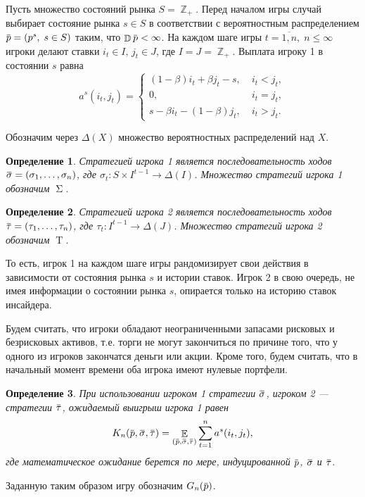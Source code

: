 \documentclass[12pt, draft]{extarticle}
\newtheorem{definition}{Определение}
\newcommand{\overbar}[1]%
{\mkern 1.5mu\overline{\mkern-1.3mu#1\mkern-1.3mu}\mkern 1.3mu}
\newcommand{\s}{\ensuremath{s}}
\newcommand{\p}{\ensuremath{\overbar{p}}}
\DeclareMathOperator{\E}{\mathbb{E}}
\DeclareMathOperator{\D}{\mathbb{D}}
\DeclareMathOperator{\Z}{\mathbb{Z}}
\newcommand{\G}[1][n]{\ensuremath{G_{#1}}}
\newcommand{\K}[1][n]{\ensuremath{K_{#1}}}
\DeclareMathOperator{\FPStrategies}{\Sigma}
\DeclareMathOperator{\SPStrategies}{\mathrm{T}}
\newcommand{\sigmav}{\ensuremath{\overbar{\sigma}}}
\newcommand{\tauv}{\ensuremath{\overbar{\tau}}}
\begin{document}
Пусть множество состояний рынка $S = \Z_+$. Перед началом игры случай выбирает
состояние рынка $\s \in S$ в соответствии с вероятностным распределением $\p =
(p^s, \; s \in S)$ таким, что $\D \p < \infty$. На каждом шаге игры $t =
\overline{1,n}, \; n \leqslant \infty$ игроки делают ставки $i_t \in I, \, j_t
\in J$, где $I = J = \Z_+$. Выплата игроку 1 в состоянии $s$ равна
\begin{equation*}
  a^s(i_t, j_t) =
  \begin{cases}
    (1-\beta) i_t + \beta j_t - s, &\; i_t < j_t, \\
    0, &\; i_t = j_t, \\
    s - \beta i_t - (1-\beta)j_t, &\; i_t > j_t.
  \end{cases}
\end{equation*}

Обозначим через $\Delta(X)$ множество вероятностных распределений над $X$.
\begin{definition}
  Стратегией игрока 1 является последовательность ходов $\sigmav = (\sigma_1,
  \ldots, \sigma_n)$, где $\sigma_t: S \times I^{t-1} \rightarrow \Delta(I)$.
  Множество стратегий игрока 1 обозначим $\FPStrategies$.
\end{definition}

\begin{definition}
  Стратегией игрока 2 является последовательность ходов $\tauv = (\tau_1,
  \ldots, \tau_n)$, где $\tau_t: I^{t-1} \rightarrow \Delta(J)$. Множество
  стратегий игрока 2 обозначим $\SPStrategies$.
\end{definition}

То есть, игрок 1 на каждом шаге игры рандомизирует свои действия в зависимости
от состояния рынка $s$ и истории ставок. Игрок 2 в свою очередь, не имея
информации о состоянии рынка $s$, опирается только на историю ставок инсайдера.

Будем считать, что игроки обладают неограниченными запасами рисковых и
безрисковых активов, т.е. торги не могут закончиться по причине того, что у
одного из игроков закончатся деньги или акции. Кроме того, будем считать, что в
начальный момент времени оба игрока имеют нулевые портфели.

\begin{definition}
  При использовании игроком 1 стратегии $\sigmav$, игроком 2 --- стратегии
  $\tauv$, ожидаемый выигрыш игрока 1 равен
  \begin{equation*}
    \K(\p, \sigmav, \tauv) =
    \E_{(\p, \sigmav, \tauv)} \sum_{t=1}^n a^s(i_t, j_t),
  \end{equation*}
  где математическое ожидание берется по мере, индуцированной $\p$, $\sigmav$ и
  $\tauv$.
\end{definition}
Заданную таким образом игру обозначим $\G(\p)$.
\end{document}
